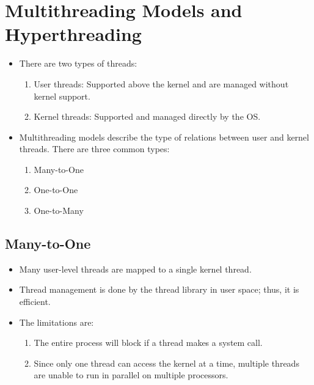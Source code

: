 \documentclass[10pt]{report}
\begin{document}
\section{Multithreading Models and Hyperthreading}
\begin{itemize}
\item There are two types of threads:
\begin{enumerate}
\item User threads: Supported above the kernel and are managed without kernel support.
\item Kernel threads: Supported and managed directly by the OS.
\end{enumerate}
\item Multithreading models describe the type of relations between user and kernel threads. There are three common types:
\begin{enumerate}
\item Many-to-One
\item One-to-One
\item One-to-Many
\end{enumerate}
\end{itemize}
\subsection{Many-to-One}
\begin{itemize}
\item Many user-level threads are mapped to a single kernel thread.
\item Thread management is done by the thread library in user space; thus, it is efficient.
\item The limitations are:
\begin{enumerate}
\item The entire process will block if a thread makes a system call.
\item Since only one thread can access the kernel at a time, multiple threads are unable to run in parallel on multiple processors.
\end{enumerate}
\end{itemize}
\end{document}
